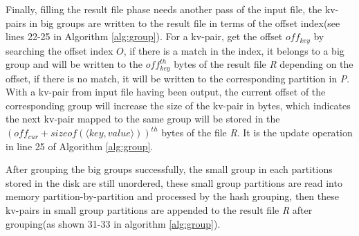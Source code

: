 Finally, filling the result file phase needs another pass of the input file, the kv-pairs in big groups are written to the result file in terms of the offset index(see lines 22-25 in Algorithm \ref{alg:group}). For a kv-pair, get the offset ${off}_{key}$  by searching the offset index $O$, if there is a match in the index, it belongs to a big group and will be written to the ${off}^{th}_{key}$ bytes of the result file \emph{R} depending on the offset, if there is no match, it will be written to the corresponding partition in \emph{P}. With a kv-pair from input file having been output, the current offset of the corresponding group will increase the size of the kv-pair in bytes, which indicates the next kv-pair mapped to the same group will be stored in the ${({off}_{cur} + sizeof(\langle key,value\rangle ))}^{th}$ bytes of the file \emph{R}. It is the update operation in line 25 of Algorithm \ref{alg:group}.

After grouping the big groups successfully, the small group in each partitions stored in the disk are still unordered, these small group partitions are read into memory partition-by-partition and processed by the hash grouping, then these kv-pairs in small group partitions are appended to the result file \emph{R} after grouping(as shown 31-33 in algorithm \ref{alg:group}). 






